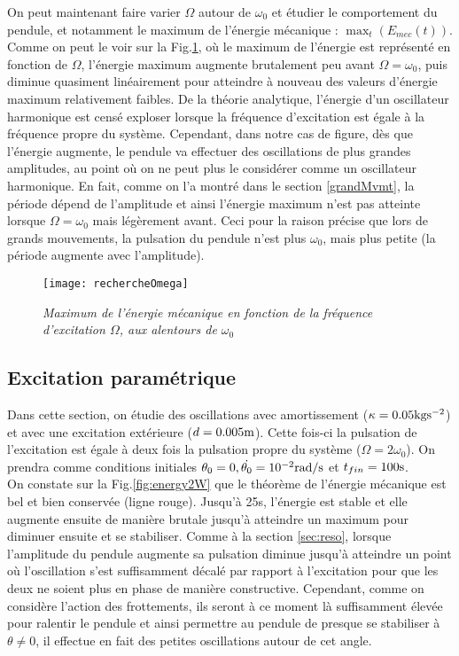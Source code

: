 \documentclass[a4paper,12pt,oneside]{article}
\def \t {\theta}
\begin{document}
On peut maintenant faire varier $\Omega$ autour de $\omega_0$ et étudier le comportement du pendule, et notamment le maximum de l'énergie mécanique : $\max_{t}(E_{mec}(t))$. Comme on peut le voir sur la Fig.\ref{rechercheOmega}, où le maximum de l'énergie est représenté en fonction de $\Omega$, l'énergie maximum augmente brutalement peu avant $\Omega=\omega_0$, puis diminue quasiment linéairement pour atteindre à nouveau des valeurs d'énergie maximum relativement faibles. De la théorie analytique, l'énergie d'un oscillateur harmonique est censé exploser lorsque la fréquence d'excitation est égale à la fréquence propre du système. Cependant, dans notre cas de figure, dès que l'énergie augmente, le pendule va effectuer des oscillations de plus grandes amplitudes, au point où on ne peut plus le considérer comme un oscillateur harmonique. En fait, comme on l'a montré dans le section \ref{grandMvmt}, la période dépend de l'amplitude et ainsi l'énergie maximum n'est pas atteinte lorsque $\Omega=\omega_0$ mais légèrement avant. Ceci pour la raison précise que lors de grands mouvements, la pulsation du pendule n'est plus $\omega_0$, mais plus petite (la période augmente avec l'amplitude).
\begin{figure}[H]
    \centerline{\texttt{[image: rechercheOmega]}}
\caption{ \label{rechercheOmega}\em
Maximum de l'énergie mécanique en fonction de la fréquence d'excitation $\Omega$, aux alentours de $\omega_0$
}
\end{figure}
\label{sec:reso}


\subsection{Excitation paramétrique}
Dans cette section, on étudie des oscillations avec amortissement ($\kappa=0.05\rm{kgs^{-2}}$) et avec une excitation extérieure ($d=0.005\rm{m}$). Cette fois-ci la pulsation de l'excitation est égale à deux fois la pulsation propre du système ($\Omega=2\omega_0$). On prendra comme conditions initiales $\theta_0=0, \dot{\theta_0}=10^{-2}\rm{rad/s}$ et $t_{fin}=100\rm{s}$. \\
On constate sur la Fig.\ref{fig:energy2W} que le théorème de l'énergie mécanique est bel et bien conservée (ligne rouge). Jusqu'à 25s, l'énergie est stable et elle augmente ensuite de manière brutale jusqu'à atteindre un maximum pour diminuer ensuite et se stabiliser. Comme à la section \ref{sec:reso}, lorsque l'amplitude du pendule augmente sa pulsation diminue jusqu'à atteindre un point où l'oscillation s'est suffisamment décalé par rapport à l'excitation pour que les deux ne soient plus en phase de manière constructive. Cependant, comme on considère l'action des frottements, ils seront à ce moment là suffisamment élevée pour ralentir le pendule et ainsi permettre au pendule de presque se stabiliser à $\t \neq 0$, il effectue en fait des petites oscillations autour de cet angle.
\end{document}
